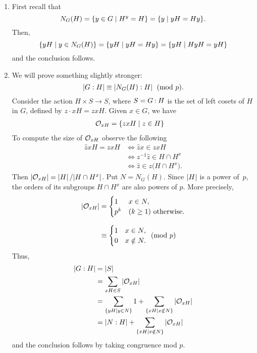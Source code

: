 \begin{solution}
\begin{enumerate}[\rm a)]
    \item First recall that
    $$
        N_G(H) = \{y\in G \mid H^y=H\} = \{y\mid yH=Hy\}.
    $$
    Then,
    $$
        \{yH\mid y\in N_G(H)\} = \{yH\mid yH=Hy\} = \{yH\mid HyH= yH\}
    $$
    and the conclusion follows.

    \item We will prove something slightly stronger:
    $$
        \left\vert{G:H}\right\vert \equiv \left\vert{N_G(H):H}\right\vert\pmod p.
    $$
    Consider the action $H\times S\to S$, where $S=G\mathbin:H$ is the set of left cosets of $H$ in $G$, defined by $z\cdot xH = zxH$. Given $x\in G$, we have
    \begin{align*}
        {\cal O}_{xH} &= \{zxH\mid z\in H\}
    \end{align*}
    To compute the size of ${\cal O}_{xH}$ observe the following
    \begin{align*}
        \hat zxH = zxH &\iff \hat zx\in zxH\\
            &\iff z^{-1}\hat z\in H\cap H^x\\
            &\iff \hat z\in z\big(H\cap H^x\big).
    \end{align*}
    Then $\left\vert{{\cal O}_{xH}}\right\vert=\left\vert{H}\right\vert/|H\cap H^x|$. Put $N=N_G(H)$. Since $\left\vert{H}\right\vert$ is a power of~$p$, the orders of its subgroups $H\cap H^x$ are also powers of $p$. More precisely,
    \begin{align*}
        \left\vert{{\cal O}_{xH}}\right\vert &=
            \begin{cases}
                1   &x\in N,\\
                p^{k} &(k\ge1)\textrm{ otherwise}.
            \end{cases}\\[0.1in]
            &\equiv
           \begin{cases}
                1 &x\in N,\\
                0 &x\notin N.
            \end{cases}\pmod p
        \end{align*}
    Thus,
    \begin{align*}
        \left\vert{G:H}\right\vert &= \left\vert{S}\right\vert\\
                &= \sum_{xH\in S}\left\vert{{\cal O}_{xH}}\right\vert\\
                &=\sum_{\{yH\mid y\in N\}}1
                    + \sum_{\{xH\mid x\notin N\}}\left\vert{{\cal O}_{xH}}\right\vert\\
                &= \left\vert{N:H}\right\vert + \sum_{\{xH\mid x\notin N\}}\left\vert{{\cal O}_{xH}}\right\vert
    \end{align*}
    and the conclusion follows by taking congruence mod $p$.
\end{enumerate}
\end{solution}

